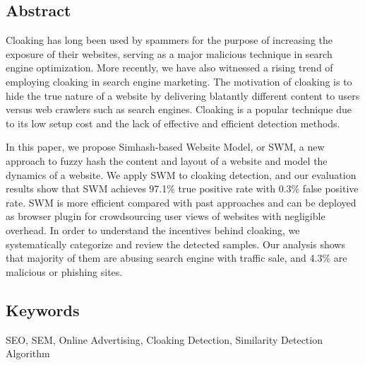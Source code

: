 \subsection*{Abstract}
Cloaking has long been used by spammers for the purpose of increasing
the exposure of their websites, serving as a major malicious technique
in search engine optimization. More recently, we have also witnessed a
rising trend of employing cloaking in search engine marketing. The
motivation of cloaking is to hide the true nature of a website by
delivering blatantly different content to users versus web crawlers
such as search engines. Cloaking is a popular technique due to its low
setup cost and the lack of effective and efficient detection methods.

In this paper, we propose Simhash-based Website Model, or SWM, a new
approach to fuzzy hash the content and layout of a website and model
the dynamics of a website.  We apply SWM to cloaking detection, and
our evaluation results show that SWM achieves 97.1\% true positive
rate with 0.3\% false positive rate.  SWM is more efficient compared
with past approaches and can be deployed as browser plugin for
crowdsourcing user views of websites with negligible overhead.  In
order to understand the incentives behind cloaking, we systematically
categorize and review the detected samples. Our analysis shows that
majority of them are abusing search engine with traffic sale, and
4.3\% are malicious or phishing sites.  

\subsection*{Keywords}
SEO, SEM, Online Advertising, Cloaking Detection, Similarity Detection
Algorithm

